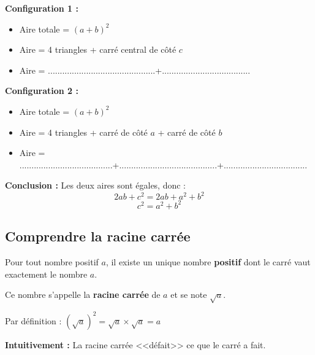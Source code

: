\begin{demobox}
	\textbf{Configuration 1 :}
	\begin{itemize}
		\item Aire totale = $(a+b)^2$
		\item Aire = 4 triangles + carré central de côté $c$
		\item Aire = .............................................+.....................................
		
	\end{itemize}
	
	\textbf{Configuration 2 :}
	\begin{itemize}
		\item Aire totale = $(a+b)^2$
		\item Aire = 4 triangles + carré de côté $a$ + carré de côté $b$
		\item Aire = .......................................+.........................................+...................................
	\end{itemize}
	
	\textbf{Conclusion :} Les deux aires sont égales, donc :
	$$2ab + c^2 = 2ab + a^2 + b^2$$
	$$\boxed{c^2 = a^2 + b^2}$$
\end{demobox}

\subsection{Comprendre la racine carrée}

\begin{definitionbox}
	Pour tout nombre positif $a$, il existe un unique nombre \textbf{positif} dont le carré vaut exactement le nombre $a$.
	
	Ce nombre s'appelle la \textbf{racine carrée} de $a$ et se note $\sqrt{a}$.
	
	Par définition : $(\sqrt{a})^2 = \sqrt{a} \times \sqrt{a} = a$
	
	\textbf{Intuitivement :} La racine carrée <<défait>> ce que le carré a fait.
\end{definitionbox}

